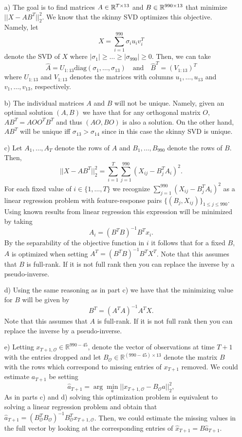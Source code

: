 \begin{enumerate}
\item[a)]
The goal is to find matrices $A \in \mathbb{R}^{T \times 13}$ and $B \in \mathbb{R}^{990 \times 13}$ that minimize $||X - AB^T||_2^2$. We know that the skinny SVD optimizes this objective. Namely, let
\[
X = \sum_{i=1}^{990} \sigma_i u_i v_i^T
\]
denote the SVD of $X$ where $\vert \sigma_1 \vert \geq \dots \geq \vert \sigma_{990} \vert \geq 0$. Then, we can take 
\[
\hat{A} = U_{1:13}\text{diag}(\sigma_1,\dots, \sigma_{13}) \ \ \ \text{ and } \ \ \ \hat{B}^T =  (V_{1:13})^T
\]
where $U_{1:13}$ and $V_{1:13}$ denotes the matrices with columns $u_1,\dots,u_{13}$ and $v_1,\dots,v_{13}$, respectively.
\item[b)]
The individual matrices $A$ and $B$ will not be unique. Namely, given an optimal solution $(A,B)$ we have that for any orthogonal matrix $O$, $AB^T = AOO^TB^T$ and thus $(AO,BO)$ is also a solution. On the other hand, $AB^T$ will be unique iff $\sigma_{13} > \sigma_{14}$ since in this case the skinny SVD is unique.
\item[c)]
Let $A_1,\dots,A_{T}$ denote the rows of $A$ and $B_1,\dots,B_{990}$ denote the rows of $B$. Then,
\[
||X - AB^T||_2^2 =  \sum_{i=1}^{T}  \sum_{j=1}^{990}   (X_{ij} - B_j^TA_i )^2.
\]
For each fixed value of $i \in \{1,\dots,T\}$ we recognize $ \sum_{j=1}^{990}   (X_{ij} - B_j^TA_i )^2$ as a linear regression problem with feature-response pairs $\{(B_j,X_{ij})\}_{1 \leq  j \leq 990}$. Using known results from linear regression this expression will be minimized by taking
\[
A_i = (B^TB)^{-1}B^Tx_i.
\]
By the separability of the objective function in $i$ it follows that for a fixed $B$, $A$ is optimized when setting $A^T = (B^TB)^{-1} B^T X^T$. Note that this assumes that $B$ is full-rank. If it is not full rank then you can replace the inverse by a pseudo-inverse.

\item[d)]
Using the same reasoning as in part c) we have that the minimizing value for $B$ will be given by
\[
B^T = (A^TA)^{-1} A^TX.
\]
Note that this assumes that $A$ is full-rank. If it is not full rank then you can replace the inverse by a pseudo-inverse.
\item[e)]
Letting $x_{T+1,\mathcal{O}}  \in \mathbb{R}^{990-45}$, denote the vector of observations at time $T+1$ with the entries dropped and let $B_{\mathcal{O}} \in \mathbb{R}^{(990-45) \times 13}$ denote the matrix $B$ with the rows which correspond to missing entries of $x_{T+1}$ removed. We could estimate $a_{T+1}$ be setting
\[
\hat{a}_{T+1} = \arg \min_{a} ||x_{T+1,\mathcal{O}} - B_{\mathcal{O}} a ||_2^2,
\]
As in parts c) and d) solving this optimization problem is equivalent to solving a linear regression problem and obtain that $\hat{a}_{T+1}=(B_{\mathcal{O}}^T B_{\mathcal{O}})^{-1} B_{\mathcal{O}}^T x_{T+1,\mathcal{O}}$. Then, we could estimate the missing values in the full vector by looking at the corresponding entries of $\hat{x}_{T+1} = B\hat{a}_{T+1}$. 
\end{enumerate}

